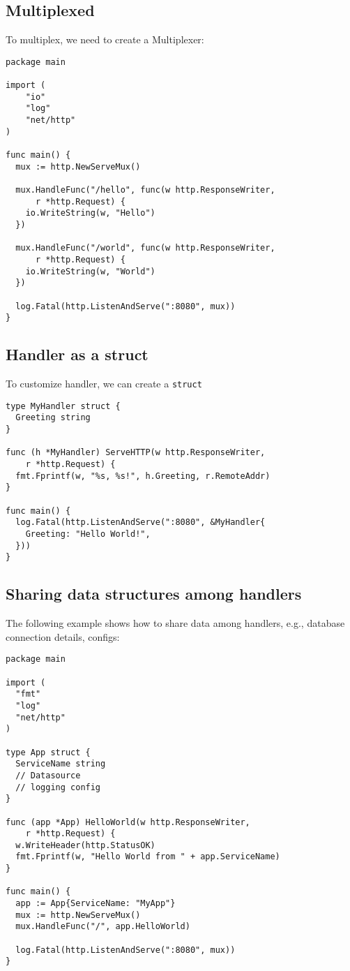 \documentclass[11pt, letterpaper]{article}
\begin{document}
\subsection{Multiplexed}

To multiplex, we need to create a Multiplexer:

\begin{verbatim}
package main

import (
    "io"
    "log"
    "net/http"
)

func main() {
  mux := http.NewServeMux()

  mux.HandleFunc("/hello", func(w http.ResponseWriter,
      r *http.Request) {
    io.WriteString(w, "Hello")
  })
  
  mux.HandleFunc("/world", func(w http.ResponseWriter,
      r *http.Request) {
    io.WriteString(w, "World")
  })

  log.Fatal(http.ListenAndServe(":8080", mux))
}
\end{verbatim}


\subsection{Handler as a struct}

To customize handler, we can create a \verb|struct|

\begin{verbatim}
type MyHandler struct {
  Greeting string
}

func (h *MyHandler) ServeHTTP(w http.ResponseWriter,
    r *http.Request) {
  fmt.Fprintf(w, "%s, %s!", h.Greeting, r.RemoteAddr)
}

func main() {
  log.Fatal(http.ListenAndServe(":8080", &MyHandler{
    Greeting: "Hello World!",
  }))
}
\end{verbatim}

\pagebreak

\subsection{Sharing data structures among handlers}

The following example shows how to share data among handlers, e.g., database connection details, configs:

\begin{verbatim}
package main

import (
  "fmt"
  "log"
  "net/http"
)

type App struct {
  ServiceName string
  // Datasource
  // logging config
}

func (app *App) HelloWorld(w http.ResponseWriter,
    r *http.Request) {
  w.WriteHeader(http.StatusOK)
  fmt.Fprintf(w, "Hello World from " + app.ServiceName)
}

func main() {
  app := App{ServiceName: "MyApp"}
  mux := http.NewServeMux()
  mux.HandleFunc("/", app.HelloWorld)

  log.Fatal(http.ListenAndServe(":8080", mux))
}
\end{verbatim}
\end{document}
